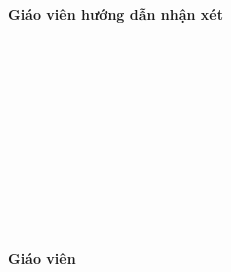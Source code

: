 \begin{center}
    \textbf{\Large Giáo viên hướng dẫn nhận xét}
\end{center}
\makebox[\textwidth]{\dotfill}\\[6pt]
\makebox[\textwidth]{\dotfill}\\[6pt]
\makebox[\textwidth]{\dotfill}\\[6pt]
\makebox[\textwidth]{\dotfill}\\[6pt]
\makebox[\textwidth]{\dotfill}\\[6pt]
\makebox[\textwidth]{\dotfill}\\[6pt]
\makebox[\textwidth]{\dotfill}\\[6pt]
\makebox[\textwidth]{\dotfill}\\[6pt]
\makebox[\textwidth]{\dotfill}\\[6pt]
\makebox[\textwidth]{\dotfill}\\[6pt]

\vspace{8cm}
\begin{flushright}
    \textbf{\Large Giáo viên}
\end{flushright}
